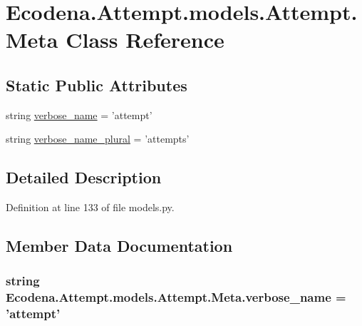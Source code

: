 \hypertarget{class_ecodena_1_1_attempt_1_1models_1_1_attempt_1_1_meta}{
\section{Ecodena.Attempt.models.Attempt.Meta Class Reference}
\label{d9/d75/class_ecodena_1_1_attempt_1_1models_1_1_attempt_1_1_meta}
}
\subsection*{Static Public Attributes}
\begin{DoxyCompactItemize}
\item 
string \hyperlink{class_ecodena_1_1_attempt_1_1models_1_1_attempt_1_1_meta_adaf86eddd52ba00b4a504002b7e5ba35}{verbose\_\-name} = 'attempt'
\item 
string \hyperlink{class_ecodena_1_1_attempt_1_1models_1_1_attempt_1_1_meta_a6c17e0ddf87e78bbb89ec50ff652dd5c}{verbose\_\-name\_\-plural} = 'attempts'
\end{DoxyCompactItemize}


\subsection{Detailed Description}


Definition at line 133 of file models.py.



\subsection{Member Data Documentation}
\hypertarget{class_ecodena_1_1_attempt_1_1models_1_1_attempt_1_1_meta_adaf86eddd52ba00b4a504002b7e5ba35}{
\subsubsection[{verbose\_\-name}]{\setlength{\rightskip}{0pt plus 5cm}string {\bf Ecodena.Attempt.models.Attempt.Meta.verbose\_\-name} = 'attempt'}}
\label{d9/d75/class_ecodena_1_1_attempt_1_1models_1_1_attempt_1_1_meta_adaf86eddd52ba00b4a504002b7e5ba35}


